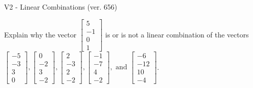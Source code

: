 \begin{exercise}
  \begin{exerciseTitle}V2 - Linear Combinations (ver. 656)\end{exerciseTitle}
  \begin{exerciseStatement}
    Explain why the vector \(\left[\begin{array}{c}
5 \\
-1 \\
0 \\
1
\end{array}\right]\)  is or is not a linear 
	combination of the vectors \(\left[\begin{array}{c}
-5 \\
-3 \\
3 \\
0
\end{array}\right] , \left[\begin{array}{c}
0 \\
-2 \\
3 \\
-2
\end{array}\right] , \left[\begin{array}{c}
2 \\
-3 \\
2 \\
-2
\end{array}\right] , \left[\begin{array}{c}
-1 \\
-7 \\
4 \\
-2
\end{array}\right] , \text{ and } \left[\begin{array}{c}
-6 \\
-12 \\
10 \\
-4
\end{array}\right]\).
	



\end{exerciseStatement}
\end{exercise}
